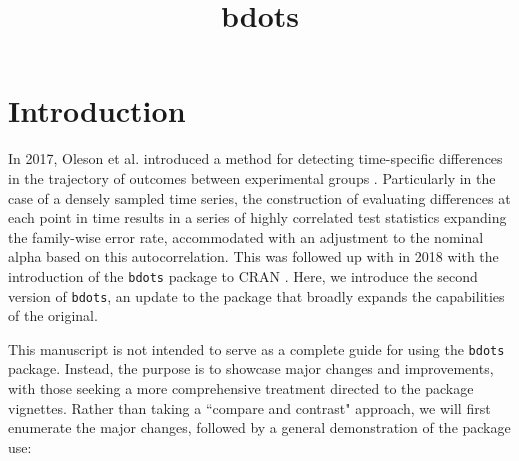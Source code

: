 \documentclass{article}
\title{bdots}
\date{}
\newcommand{\xt}{\texttt}%
\begin{document}


%



\section{Introduction}



In 2017, Oleson et al. introduced a method for detecting time-specific differences in the trajectory of outcomes between experimental groups \cite{oleson2017detecting}. Particularly in the case of a densely sampled time series, the construction of evaluating differences at each point in time results in a series of highly correlated test statistics expanding the family-wise error rate, accommodated with an adjustment to the nominal alpha based on this autocorrelation. This was followed up with in 2018 with the introduction of the \xt{bdots} package to CRAN \cite{seedorff2018bdots}. Here, we introduce the second version of \texttt{bdots}, an update to the package that broadly expands the capabilities of the original. 

This manuscript is not intended to serve as a complete guide for using the \xt{bdots} package. Instead, the purpose is to showcase major changes and improvements, with those seeking a more comprehensive treatment directed to the package vignettes. Rather than taking a ``compare and contrast" approach, we will first enumerate the major changes, followed by a general demonstration of the package use:
\end{document}
